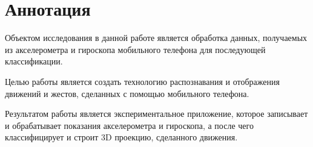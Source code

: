 \section{Аннотация}

Объектом исследования в данной работе является обработка данных, получаемых из акселерометра и гироскопа мобильного телефона для последующей классификации.

Целью работы является создать технологию распознавания и отображения движений и жестов, сделанных с помощью мобильного телефона.

Результатом работы является экспериментальное приложение, которое записывает и обрабатывает показания акселерометра и гироскопа, а после чего классифицирует и строит 3D проекцию, сделанного движения.